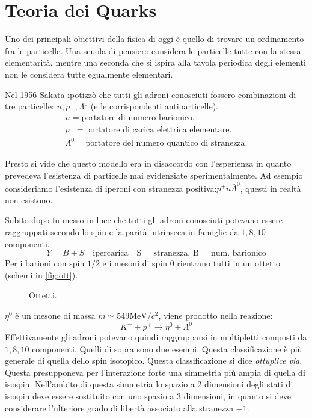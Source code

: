 \section{Teoria dei Quarks}
 Uno dei principali obiettivi della fisica di oggi è quello
di trovare un ordinamento fra le particelle.
Una scuola di pensiero considera le particelle tutte con la stessa elementarità,
mentre una seconda che si ispira alla tavola periodica degli elementi non le
considera tutte egualmente elementari.

Nel 1956 Sakata ipotizzò che tutti gli adroni conosciuti fossero combinazioni di
tre particelle: $n,p^+,\Lambda^0$ (e le corrispondenti antiparticelle).
\begin{gather}
n=\text{portatore di numero barionico.}\\
p^+=\text{portatore di carica elettrica elementare.}\\
\Lambda^0=\text{portatore del numero quantico di stranezza}.
\end{gather}

Presto si vide che questo modello era in disaccordo con l'esperienza in quanto
prevedeva l'esistenza di particelle mai evidenziate sperimentalmente.
Ad esempio consideriamo l'esistenza di iperoni con stranezza
positiva:$p^+n\bar{\Lambda}^0$, questi in realtà non esistono.

Subito dopo fu messo in luce che tutti gli adroni conosciuti potevano essere
raggruppati secondo lo spin e la parità intrinseca in famiglie da $1,8,10$
componenti.
\[
Y=B+S\quad\text{ipercarica}\quad\text{S = stranezza, B = num. barionico}
\]
Per i barioni con spin $1/2$ e i mesoni di spin $0$ rientrano tutti in un
ottetto (schemi in \autoref{fig:ott}).
\begin{figure}[!h]
  \caption{Ottetti.}
  \label{fig:ott}
\end{figure}

$\eta^0$ è un mesone di massa $m\simeq549\si{\mega\electronvolt}/c^2$, viene
prodotto nella reazione:
\[
K^-+p^+\rightarrow \eta^0+\Lambda^0
\]
Effettivamente gli adroni potevano quindi raggrupparsi in multipletti composti
da $1,8,10$ componenti. Quelli di sopra sono due esempi.
Questa classificazione è più generale di quella dello spin isotopico. Questa
classificazione si dice \textit{ottuplice via}.
Questa presupponeva per l'interazione forte una simmetria più ampia di quella di
isospin. Nell'ambito di questa simmetria lo spazio a 2 dimensioni degli stati di
isospin deve essere sostituito con uno spazio a 3 dimensioni, in quanto si deve
considerare l'ulteriore grado di libertà associato alla stranezza $-1$.


